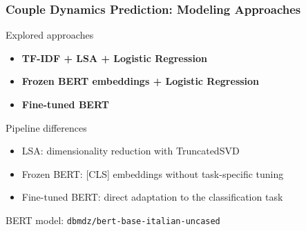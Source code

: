 \documentclass{beamer}
\begin{document}
\begin{frame}
\frametitle{Couple Dynamics Prediction: Modeling Approaches}

\begin{block}{Explored approaches}
\begin{itemize}
\item \textbf{TF-IDF + LSA + Logistic Regression}
\item \textbf{Frozen BERT embeddings + Logistic Regression}
\item \textbf{Fine-tuned BERT}
\end{itemize}
\end{block}

\begin{block}{Pipeline differences}
\begin{itemize}
\item LSA: dimensionality reduction with TruncatedSVD
\item Frozen BERT: [CLS] embeddings without task-specific tuning
\item Fine-tuned BERT: direct adaptation to the classification task
\end{itemize}
\end{block}

\vspace{0.3cm}
\begin{center}
\colorbox{blue!10}{\parbox{0.8\linewidth}{\centering BERT model: \texttt{dbmdz/bert-base-italian-uncased}}}
\end{center}

\end{frame}
\end{document}
